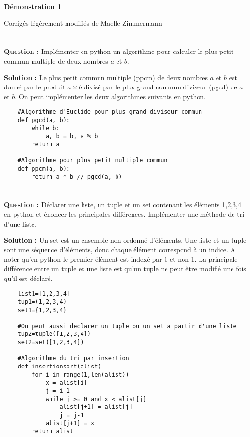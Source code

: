 \documentclass[11pt]{article} %
\newenvironment{question}[1][\unskip]{%
	\par
	\noindent
	\textbf{Question #1:}
	\noindent}
{\medskip}
\newenvironment{solution}[1][\unskip]{%
	\par
	\noindent
	\textbf{Solution #1:}
	\noindent}
{\medskip}
\begin{document}

\noindent \hrulefill


\centerline{\bfseries Démonstration 1}
\centerline{Corrigés légèrement modifiés de Maelle Zimmermann}
\noindent \hrulefill

\vspace{1cm}

\section{}

\begin{question}
	Implémenter en python un algorithme pour calculer le plus petit commun multiple de deux nombres $a$ et $b$.
\end{question}

\begin{solution}
	Le plus petit commun multiple (ppcm) de deux nombres $a$ et $b$ est donné par le produit $a\times b$ divisé par le plus grand commun diviseur (pgcd) de $a$ et $b$. On peut implémenter les deux algorithmes suivants en python.
	\begin{lstlisting}
	#Algorithme d'Euclide pour plus grand diviseur commun
	def pgcd(a, b):	
		while b:      
			a, b = b, a % b
		return a
	
	#Algorithme pour plus petit multiple commun
	def ppcm(a, b):
		return a * b // pgcd(a, b)
	\end{lstlisting}
\end{solution}

\section{}
\begin{question}
	Déclarer une liste, un tuple et un set contenant les éléments 1,2,3,4 en python et énoncer les principales différences. Implémenter une méthode de tri d'une liste.
\end{question}

\begin{solution}
	Un set est un ensemble non ordonné d'éléments. Une liste et un tuple sont une séquence d'éléments, donc chaque élément correspond à un indice. A noter qu'en python le premier élément est indexé par 0 et non 1. La principale différence entre un tuple et une liste est qu'un tuple ne peut être modifié une fois qu'il est déclaré.
	\begin{lstlisting}
	list1=[1,2,3,4]
	tup1=(1,2,3,4)
	set1={1,2,3,4}
	
	#On peut aussi declarer un tuple ou un set a partir d'une liste
	tup2=tuple([1,2,3,4])
	set2=set([1,2,3,4])
	
	#Algorithme du tri par insertion
	def insertionsort(alist)
		for i in range(1,len(alist))
			x = alist[i]
			j = i-1
			while j >= 0 and x < alist[j]
				alist[j+1] = alist[j]
				j = j-1
			alist[j+1] = x
		return alist
			
	\end{lstlisting}
\end{solution}
\end{document}
